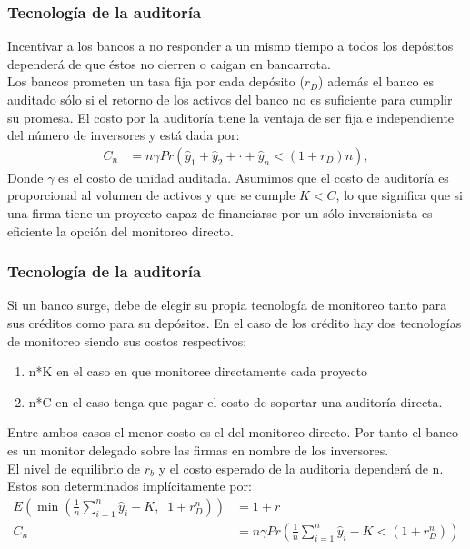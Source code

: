 \begin{frame}
    \frametitle{{\normalsize Tecnología de la auditoría} {}}
    
    Incentivar a los bancos a no responder a un mismo tiempo a todos los depósitos dependerá de que éstos no cierren o caigan en bancarrota. \\
    Los bancos prometen un tasa fija por cada depósito ($r_{D}$)  además el banco es auditado sólo si el retorno de los activos del banco no es suficiente para cumplir su promesa.
    El costo por la auditoría tiene la ventaja de ser fija e independiente del número de inversores y está dada por:
    \begin{align}
    C_{n}&=n\gamma Pr(\hat{y}_{1}+\hat{y}_{2}+\cdot+\hat{y}_{n}<(1+r_{D})n),
    \end{align}
    Donde $\gamma$ es el costo de unidad auditada. Asumimos que el costo de auditoría es proporcional al volumen de activos y que se cumple $K<C$, lo que significa que si una firma tiene un proyecto capaz de financiarse por un sólo inversionista  es eficiente la opción del monitoreo directo. 
    
\end{frame}


\begin{frame}
    \frametitle{{\normalsize Tecnología de la auditoría} {}}
    
    Si un banco surge, debe de elegir su propia tecnología de monitoreo tanto para sus créditos como para su depósitos. En el caso de los crédito hay dos tecnologías de monitoreo siendo sus costos respectivos:
    \begin{enumerate}
        \item n*K en el caso en que monitoree directamente cada proyecto
        \item n*C en el caso tenga que pagar el costo de soportar una auditoría directa.
    \end{enumerate}
    Entre ambos casos el menor costo es el del monitoreo directo. Por tanto el banco es un monitor delegado sobre las firmas en nombre de los inversores. \\
    El nivel de equilibrio de $r_{b} $ y el costo esperado de la auditoria dependerá de n. Estos son determinados implícitamente por:
    \begin{align}
    E(\min(\frac{1}{n}\sum_{i=1}^{n}\hat{y}_{i}-K,\; \; 1+r_{D}^{n}))&=1+r \\
    C_{n}&=n\gamma Pr(\frac{1}{n}\sum_{i=1}^{n}\hat{y}_{i}-K<(1+r_{D}^{n}))
    \end{align}
    
   
\end{frame}

